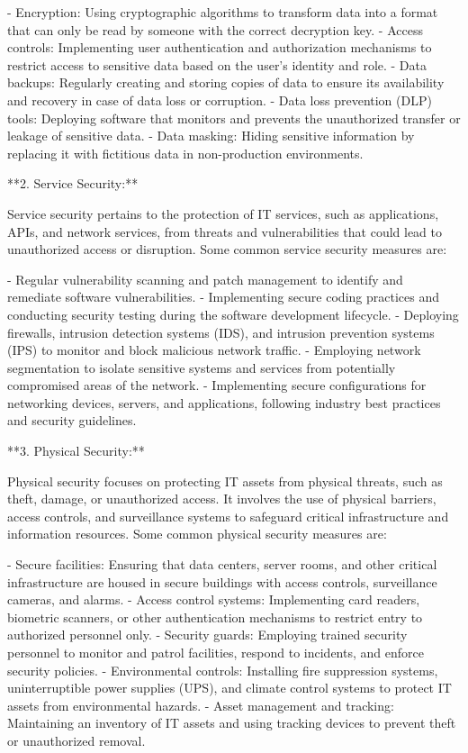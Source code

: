 \documentclass{article}
\begin{document}
- Encryption: Using cryptographic algorithms to transform data into a format that can only be read by someone with the correct decryption key.
- Access controls: Implementing user authentication and authorization mechanisms to restrict access to sensitive data based on the user's identity and role.
- Data backups: Regularly creating and storing copies of data to ensure its availability and recovery in case of data loss or corruption.
- Data loss prevention (DLP) tools: Deploying software that monitors and prevents the unauthorized transfer or leakage of sensitive data.
- Data masking: Hiding sensitive information by replacing it with fictitious data in non-production environments.

**2. Service Security:**

Service security pertains to the protection of IT services, such as applications, APIs, and network services, from threats and vulnerabilities that could lead to unauthorized access or disruption. Some common service security measures are:

- Regular vulnerability scanning and patch management to identify and remediate software vulnerabilities.
- Implementing secure coding practices and conducting security testing during the software development lifecycle.
- Deploying firewalls, intrusion detection systems (IDS), and intrusion prevention systems (IPS) to monitor and block malicious network traffic.
- Employing network segmentation to isolate sensitive systems and services from potentially compromised areas of the network.
- Implementing secure configurations for networking devices, servers, and applications, following industry best practices and security guidelines.

**3. Physical Security:**

Physical security focuses on protecting IT assets from physical threats, such as theft, damage, or unauthorized access. It involves the use of physical barriers, access controls, and surveillance systems to safeguard critical infrastructure and information resources. Some common physical security measures are:

- Secure facilities: Ensuring that data centers, server rooms, and other critical infrastructure are housed in secure buildings with access controls, surveillance cameras, and alarms.
- Access control systems: Implementing card readers, biometric scanners, or other authentication mechanisms to restrict entry to authorized personnel only.
- Security guards: Employing trained security personnel to monitor and patrol facilities, respond to incidents, and enforce security policies.
- Environmental controls: Installing fire suppression systems, uninterruptible power supplies (UPS), and climate control systems to protect IT assets from environmental hazards.
- Asset management and tracking: Maintaining an inventory of IT assets and using tracking devices to prevent theft or unauthorized removal.
\end{document}
